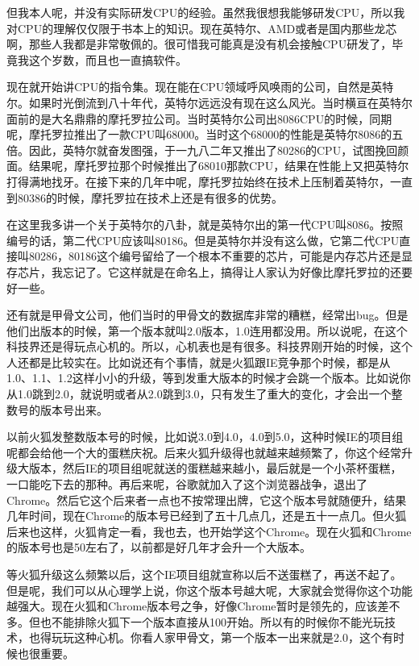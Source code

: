 \documentclass[
  letterpaper,
  DIV=11,
  numbers=noendperiod]{scrreprt}
\begin{document}
但我本人呢，并没有实际研发CPU的经验。虽然我很想我能够研发CPU，所以我对CPU的理解仅仅限于书本上的知识。现在英特尔、AMD或者是国内那些龙芯啊，那些人我都是非常敬佩的。很可惜我可能真是没有机会接触CPU研发了，毕竟我这个岁数，而且也一直搞软件。

现在就开始讲CPU的指令集。现在能在CPU领域呼风唤雨的公司，自然是英特尔。如果时光倒流到八十年代，英特尔远远没有现在这么风光。当时横亘在英特尔面前的是大名鼎鼎的摩托罗拉公司。当时英特尔公司出8086CPU的时候，同期呢，摩托罗拉推出了一款CPU叫68000。当时这个68000的性能是英特尔8086的五倍。因此，英特尔就奋发图强，于一九八二年又推出了80286的CPU，试图挽回颜面。结果呢，摩托罗拉那个时候推出了68010那款CPU，结果在性能上又把英特尔打得满地找牙。在接下来的几年中呢，摩托罗拉始终在技术上压制着英特尔，一直到80386的时候，摩托罗拉在技术上还是有很多的优势。

在这里我多讲一个关于英特尔的八卦，就是英特尔出的第一代CPU叫8086。按照编号的话，第二代CPU应该叫80186。但是英特尔并没有这么做，它第二代CPU直接叫80286，80186这个编号留给了一个根本不重要的芯片，可能是内存芯片还是显存芯片，我忘记了。它这样就是在命名上，搞得让人家认为好像比摩托罗拉的还要好一些。

还有就是甲骨文公司，他们当时的甲骨文的数据库非常的糟糕，经常出bug。但是他们出版本的时候，第一个版本就叫2.0版本，1.0连用都没用。所以说呢，在这个科技界还是得玩点心机的。所以，心机表也是有很多。科技界刚开始的时候，这个人还都是比较实在。比如说还有个事情，就是火狐跟IE竞争那个时候，都是从1.0、1.1、1.2这样小小的升级，等到发重大版本的时候才会跳一个版本。比如说你从1.0跳到2.0，就说明或者从2.0跳到3.0，只有发生了重大的变化，才会出一个整数号的版本号出来。

以前火狐发整数版本号的时候，比如说3.0到4.0，4.0到5.0，这种时候IE的项目组呢都会给他一个大的蛋糕庆祝。后来火狐升级得也就越来越频繁了，你这个经常升级大版本，然后IE的项目组呢就送的蛋糕越来越小，最后就是一个小茶杯蛋糕，一口能吃下去的那种。再后来呢，谷歌就加入了这个浏览器战争，退出了Chrome。然后它这个后来者一点也不按常理出牌，它这个版本号就随便升，结果几年时间，现在Chrome的版本号已经到了五十几点几，还是五十一点几。但火狐后来也这样，火狐肯定一看，我也去，也开始学这个Chrome。现在火狐和Chrome的版本号也是50左右了，以前都是好几年才会升一个大版本。

等火狐升级这么频繁以后，这个IE项目组就宣称以后不送蛋糕了，再送不起了。但是呢，我们可以从心理学上说，你这个版本号越大呢，大家就会觉得你这个功能越强大。现在火狐和Chrome版本号之争，好像Chrome暂时是领先的，应该差不多。但也不能排除火狐下一个版本直接从100开始。所以有的时候你不能光玩技术，也得玩玩这种心机。你看人家甲骨文，第一个版本一出来就是2.0，这个有时候也很重要。
\end{document}
